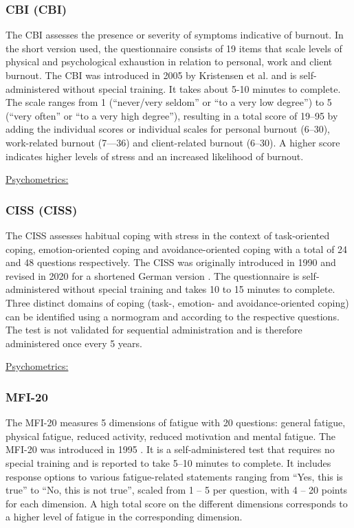 \subsubsection{\acl{CBI} (\acs{CBI})}
\label{questionnaires:CBI}
The \acl{CBI} assesses the presence or severity of symptoms indicative of burnout. In the short version used, the questionnaire consists of 19 items that scale levels of physical and psychological exhaustion in relation to personal, work and client burnout. The CBI was introduced in 2005 by Kristensen et al. \cite{kristensen2005cbi} and is self-administered without special training. It takes about 5-10 minutes to complete. The scale ranges from 1 (``never/very seldom'' or ``to a very low degree'') to 5 (``very often'' or ``to a very high degree''), resulting in a total score of 19--95 by adding the individual scores or individual scales for personal burnout (6--30), work-related burnout (7---36) and client-related burnout (6--30). A higher score indicates higher levels of stress and an increased likelihood of burnout.

\underline{Psychometrics:}

\subsubsection{\acl{CISS} (\acs{CISS})}
\label{questionnaires:CISS}
The \acl{CISS} assesses habitual coping with stress in the context of task-oriented coping, emotion-oriented coping and avoidance-oriented coping with a total of 24 and 48 questions respectively. The CISS was originally introduced in 1990 \cite{endler1990ciss} and revised in 2020 for a shortened German version \cite{kalin2020ciss}. The questionnaire is self-administered without special training and takes 10 to 15 minutes to complete. Three distinct domains of coping (task-, emotion- and avoidance-oriented coping) can be identified using a normogram and according to the respective questions. The test is not validated for sequential administration and is therefore administered once every 5 years.

\underline{Psychometrics:}

\subsubsection{\acl{MFI-20}}
\label{questionnaires:MFI20}
The \acl{MFI-20} measures 5 dimensions of fatigue with 20 questions: general fatigue, physical fatigue, reduced activity, reduced motivation and mental fatigue. The \acs{MFI-20} was introduced in 1995 \cite{smets1995mfi20}. It is a self-administered test that requires no special training and is reported to take 5--10 minutes to complete. It includes response options to various fatigue-related statements ranging from ``Yes, this is true'' to ``No, this is not true'', scaled from 1 -- 5 per question, with 4 -- 20 points for each dimension. A high total score on the different dimensions corresponds to a higher level of fatigue in the corresponding dimension.

